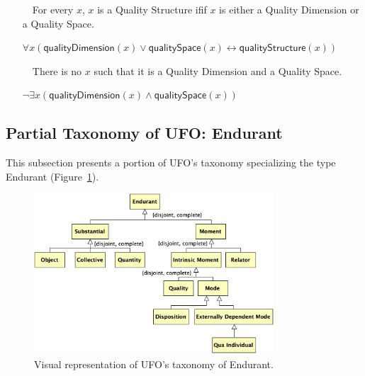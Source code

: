\documentclass{article}
\newcommand{\AxLabel}{a}
\newcounter{cntax}
\newcommand{\myax}[1]{\refstepcounter{cntax}{\bf \small \AxLabel\thecntax}\label{#1}$\,\,\,\,$}
\newcommand{\me}[1]{\textsf{#1}}
\begin{document}
\begin{itemize}
    \item[\myax{ax_qualityStructure_taxonomy}] For every $x$, $x$ is a \me{Quality Structure} ifif $x$ is either a \me{Quality Dimension} or a \me{Quality Space}.
    
    $\forall x(\textsf{qualityDimension}(x)\vee \textsf{qualitySpace}(x)\leftrightarrow \textsf{qualityStructure}(x))$
    
    
    
    
    \item[\myax{ax_qualityStructure_partition}] There is no $x$ such that it is a \me{Quality Dimension} and a \me{Quality Space}.
    
    $\neg \exists x(\textsf{qualityDimension}(x)\wedge \textsf{qualitySpace}(x))$
    
    
\end{itemize}



\subsection{Partial Taxonomy of UFO: \me{Endurant}}

This subsection presents a portion of UFO's taxonomy specializing the type \me{Endurant} (Figure~\ref{fig:03_taxonomy_endurant}).

\begin{figure}[ht]
    \centering
    \includegraphics[width=0.8\textwidth]{diagrams/Endurant_Diagram.png}
    \caption{Visual representation of UFO's taxonomy of \me{Endurant}.}
    \label{fig:03_taxonomy_endurant}
\end{figure}
\end{document}
